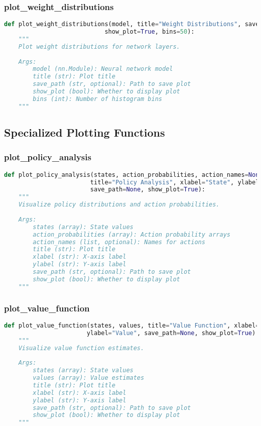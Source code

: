 \subsubsection{plot\_weight\_distributions}

\begin{lstlisting}[language=python]
def plot_weight_distributions(model, title="Weight Distributions", save_path=None,
                            show_plot=True, bins=50):
    """
    Plot weight distributions for network layers.
    
    Args:
        model (nn.Module): Neural network model
        title (str): Plot title
        save_path (str, optional): Path to save plot
        show_plot (bool): Whether to display plot
        bins (int): Number of histogram bins
    """
\end{lstlisting}

\subsection{Specialized Plotting Functions}

\subsubsection{plot\_policy\_analysis}

\begin{lstlisting}[language=python]
def plot_policy_analysis(states, action_probabilities, action_names=None,
                        title="Policy Analysis", xlabel="State", ylabel="Action Probability",
                        save_path=None, show_plot=True):
    """
    Visualize policy distributions and action probabilities.
    
    Args:
        states (array): State values
        action_probabilities (array): Action probability arrays
        action_names (list, optional): Names for actions
        title (str): Plot title
        xlabel (str): X-axis label
        ylabel (str): Y-axis label
        save_path (str, optional): Path to save plot
        show_plot (bool): Whether to display plot
    """
\end{lstlisting}

\subsubsection{plot\_value\_function}

\begin{lstlisting}[language=python]
def plot_value_function(states, values, title="Value Function", xlabel="State",
                       ylabel="Value", save_path=None, show_plot=True):
    """
    Visualize value function estimates.
    
    Args:
        states (array): State values
        values (array): Value estimates
        title (str): Plot title
        xlabel (str): X-axis label
        ylabel (str): Y-axis label
        save_path (str, optional): Path to save plot
        show_plot (bool): Whether to display plot
    """
\end{lstlisting}

